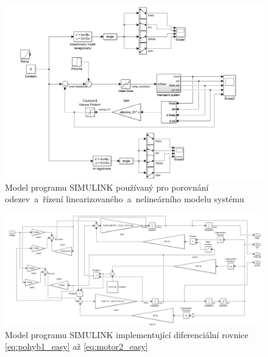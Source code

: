 \documentclass[conference]{IEEEtran}
\begin{document}
\begin{figure}[htbp]
    \centerline{\includegraphics[width=\linewidth]{simulace_simulink.png}}
    \caption{Model programu SIMULINK používaný pro porovnání odezev~a~řízení linearizovaného~a~nelineárního modelu systému}
    \label{fig:simulink_simulace}        
\end{figure}

\begin{figure}[htbp]
    \centerline{\includegraphics[width=\linewidth]{nelinearni_system_simulink.png}}
    \caption{Model programu SIMULINK implementující diferenciální rovnice \eqref{eq:pohyb1_easy} až \eqref{eq:motor2_easy}}
    \label{fig:simulink_nelin_model}        
\end{figure}
\end{document}
